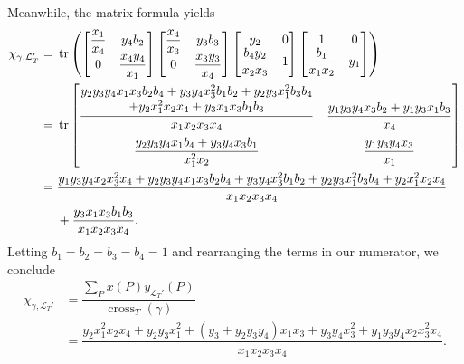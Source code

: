\documentclass[pdftex]{sigma}
\numberwithin{equation}{section}
\theoremstyle{definition}
\begin{document}
Meanwhile, the matrix formula yields
\begin{align*}
\chi_{\gamma, \mathcal{L}_T'}={}&\operatorname{tr}\left(
\begin{bmatrix}
 \dfrac{x_1}{x_4} & y_4b_2\\
 0 & \dfrac{x_4y_4}{x_1}
\end{bmatrix}
\begin{bmatrix}
 \dfrac{x_4}{x_3} & y_3b_3\\
 0 & \dfrac{x_3y_3}{x_4}
\end{bmatrix}
\begin{bmatrix}
 y_2 & 0\\
 \dfrac{b_4y_2}{x_2x_3} & 1
\end{bmatrix}
\begin{bmatrix}
 1 & 0\\
 \dfrac{b_1}{x_1x_2} & y_1
\end{bmatrix}\right)\\
={}&\operatorname{tr}
\begin{bmatrix}
 \dfrac{\begin{array}{@{}c@{}}y_2y_3y_4x_1x_3b_2b_4+y_3y_4x_3^2b_1b_2+y_2y_3x_1^2b_3b_4\\
 +y_2x_1^2x_2x_4+y_3x_1x_3b_1b_3\end{array}}{x_1x_2x_3x_4} & \dfrac{y_1y_3y_4x_3b_2+y_1y_3x_1b_3}{x_4}\vspace{2mm}\\
 \dfrac{y_2y_3y_4x_1b_4+y_3y_4x_3b_1}{x_1^2x_2} & \dfrac{y_1y_3y_4x_3}{x_1}
\end{bmatrix}\\
={}&\dfrac{y_1y_3y_4x_2x_3^2x_4+y_2y_3y_4x_1x_3b_2b_4+y_3y_4x_3^2b_1b_2+y_2y_3x_1^2b_3b_4+y_2x_1^2x_2x_4}{x_1x_2x_3x_4}\\
&+\dfrac{y_3x_1x_3b_1b_3}{x_1x_2x_3x_4}.
\end{align*}
Letting $b_1=b_2=b_3=b_4=1$ and rearranging the terms in our numerator, we conclude
\begin{align*}
\chi_{\gamma, \mathcal{L}_T'}&=\dfrac{\sum_P x(P)y_{\mathcal{L}_T'}(P)}{\operatorname{cross}_T(\gamma)}\\
&=\dfrac{y_2x_1^2x_2x_4+y_2y_3x_1^2+(y_3+y_2y_3y_4)x_1x_3+y_3y_4x_3^2+y_1y_3y_4x_2x_3^2x_4}{x_1x_2x_3x_4}.\end{align*}
\end{document}
